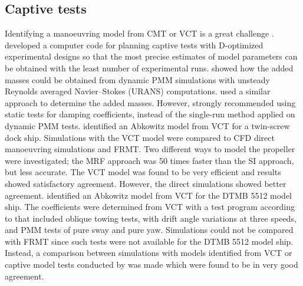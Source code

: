 \subsection{Captive tests} \label{sec:CT}
Identifying a manoeuvring model from CMT or VCT is a great challenge  \cite{sutuloAlgorithmOfflineIdentification2014}.
\textcite{sutuloSynthesisExperimentalDesigns2004} developed a computer code for planning captive tests with D-optimized experimental designs so that the most precise estimates of model parameters can be obtained with the least number of experimental runs.
\textcite{sakamotoURANSSimulationsStatic2012} showed how the added masses could be obtained from dynamic PMM simulations with unsteady Reynolds averaged Navier–Stokes (URANS) computations. \textcite{elmoctarRANSBasedSimulatedShip2014} used a similar approach to determine the added masses. 
However, \textcite{sakamotoURANSSimulationsStatic2012} strongly recommended using static tests for damping coefficients, instead of the single-run method applied on dynamic PMM tests.
\textcite{elmoctarRANSBasedSimulatedShip2014} identified an Abkowitz model from VCT for a twin-screw dock ship. Simulations with the VCT model were compared to CFD direct manoeuvring simulations and FRMT. Two different ways to model the propeller were investigated; the MRF approach was 50 times faster than the SI approach, but less accurate. The VCT model was found to be very efficient and results showed satisfactory agreement. However, the direct simulations showed better agreement.
\textcite{hajivandVirtualSimulationManeuvering2015} identified an Abkowitz model from VCT for the DTMB 5512 model ship. The coefficients were determined from VCT with a test program according to \textcite{yoonBenchmarkCFDValidation2015c} that included oblique towing tests, with drift angle variations at three speeds, and PMM tests of pure sway and pure yaw.
Simulations could not be compared with FRMT since such tests were not available for the DTMB 5512 model ship. 
Instead, a comparison between simulations with models identified from VCT or captive model tests conducted by \textcite{yoonBenchmarkCFDValidation2015c} was made which were found to be in very good agreement.

